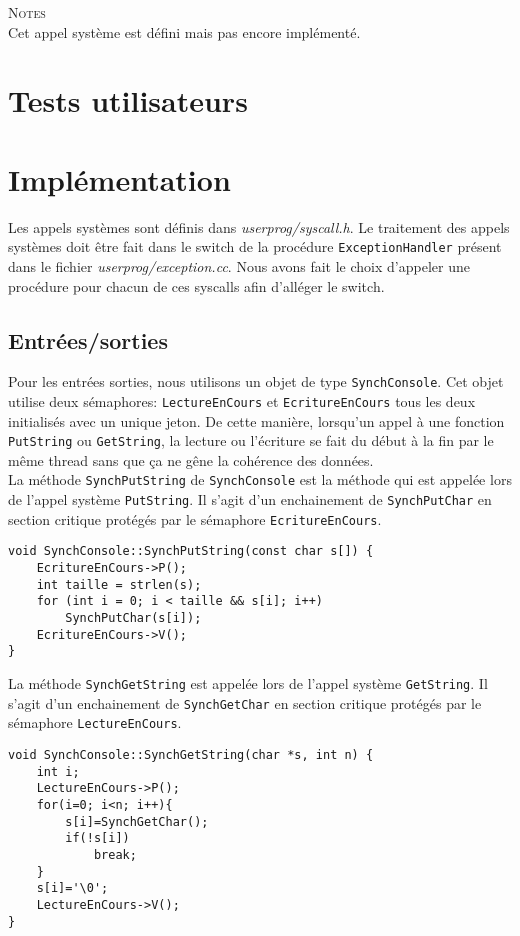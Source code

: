 \documentclass{report}
\begin{document}
\textsc{Notes}\\
	Cet appel système est défini mais pas encore implémenté.

\section*{Tests utilisateurs}

\section*{Implémentation}
Les appels systèmes sont définis dans \textit{userprog/syscall.h}. Le traitement des appels systèmes doit être fait dans le switch de la procédure \texttt{ExceptionHandler} présent dans le fichier \textit{userprog/exception.cc}. Nous avons fait le choix d'appeler une procédure pour chacun de ces syscalls afin d'alléger le switch.

\subsection*{Entrées/sorties}
Pour les entrées sorties, nous utilisons un objet de type \texttt{SynchConsole}. Cet objet utilise deux sémaphores: \texttt{LectureEnCours} et \texttt{EcritureEnCours} tous les deux initialisés avec un unique jeton. De cette manière, lorsqu'un appel à une fonction \texttt{PutString} ou \texttt{GetString}, la lecture ou l'écriture se fait du début à la fin par le même thread sans que ça ne gêne la cohérence des données.\\

La méthode \texttt{SynchPutString} de \texttt{SynchConsole} est la méthode qui est appelée lors de l'appel système \texttt{PutString}. Il s'agit d'un enchainement de \texttt{SynchPutChar} en section critique protégés par le sémaphore \texttt{EcritureEnCours}.
\begin{verbatim}
void SynchConsole::SynchPutString(const char s[]) {
    EcritureEnCours->P();
    int taille = strlen(s);
    for (int i = 0; i < taille && s[i]; i++)
        SynchPutChar(s[i]);
    EcritureEnCours->V();
}
\end{verbatim}

La méthode \texttt{SynchGetString} est appelée lors de l'appel système \texttt{GetString}. Il s'agit d'un enchainement de \texttt{SynchGetChar} en section critique protégés par le sémaphore \texttt{LectureEnCours}.
\begin{verbatim}
void SynchConsole::SynchGetString(char *s, int n) {
    int i;
    LectureEnCours->P();
    for(i=0; i<n; i++){
        s[i]=SynchGetChar();
        if(!s[i])
            break;
    }
    s[i]='\0';
    LectureEnCours->V();
}
\end{verbatim}
\end{document}

